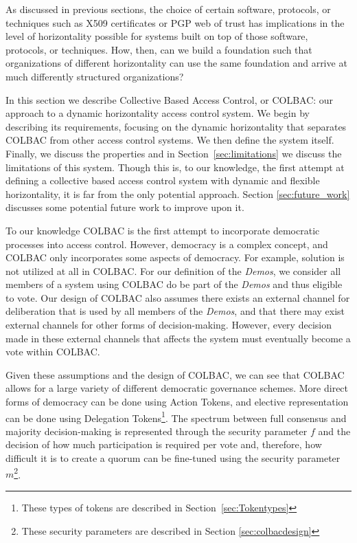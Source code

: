 As discussed in previous sections, the choice of certain software, protocols, or
techniques such as X509 certificates or PGP web of trust has implications in the
level of horizontality possible for systems built on top of those software,
protocols, or techniques. How, then, can we build a foundation such that
organizations of different horizontality can use the same foundation and arrive
at much differently structured organizations?

In this section we describe Collective Based Access Control, or COLBAC: our
approach to a dynamic horizontality access control system. We begin by
describing its requirements, focusing on the dynamic horizontality that
separates COLBAC from other access control systems. We then define the system
itself. Finally, we discuss the properties and in Section~\ref{sec:limitations}
we discuss the limitations of this system. Though this is, to our knowledge, the
first attempt at defining a collective based access control system with dynamic
and flexible horizontality, it is far from the only potential approach. Section
\ref{sec:future_work} discusses some potential future work to improve upon it.

To our knowledge COLBAC is the first attempt to incorporate democratic processes
into access control. However, democracy is a complex concept, and COLBAC only
incorporates some aspects of democracy. For example, solution is not utilized
at all in COLBAC. For our definition of the \textit{Demos}, we consider all
members of a system using COLBAC do be part of the \textit{Demos} and thus
eligible to vote. Our design of COLBAC also assumes there exists an external
channel for deliberation that is used by all members of the \textit{Demos}, and
that there may exist external channels for other forms of decision-making.
However, every decision made in these external channels that affects the system
must eventually become a vote within COLBAC.

Given these assumptions and the design of COLBAC, we can see that COLBAC allows
for a large variety of different democratic governance schemes. More direct
forms of democracy can be done using Action Tokens, and elective representation
can be done using Delegation Tokens\footnote{These types of tokens are described
in Section~\ref{sec:Tokentypes}}. The spectrum between full consensus and
majority decision-making is represented through the security parameter $f$ and
the decision of how much participation is required per vote and, therefore, how
difficult it is to create a quorum can be fine-tuned using the security
parameter $m$\footnote{These security parameters are described in Section
\ref{sec:colbacdesign}}.

